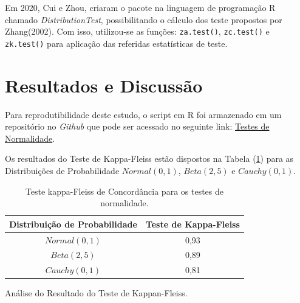 \documentclass[a4paper,11pt]{article} %
\begin{document}
Em 2020, Cui e Zhou, criaram o pacote na linguagem de programação R chamado \textit{DistributionTest}, possibilitando o cálculo dos teste propostos por Zhang(2002). Com isso,  utilizou-se as funções: \texttt{za.test()}, \texttt{zc.test()} e \texttt{zk.test()} para aplicação das referidas estatísticas de teste.


\section{Resultados e Discussão}

Para reprodutibilidade deste estudo, o script em R foi armazenado em um repositório no \textit{Github} que pode ser acessado no seguinte link: \href{https://github.com/MarioDhiego/Teste\_Normalidade}{Testes de Normalidade}.

\vspace{0.5cm}

Os resultados do Teste de Kappa-Fleiss estão dispostos na Tabela (\ref{tab:resultKappaFleiss}) para as Distribuições de Probabilidade $Normal(0, 1)$, $Beta(2, 5)$ e $Cauchy(0, 1)$.

\begin{table}[H]
\centering
\caption{Teste kappa-Fleiss de Concordância para os testes de normalidade.}
    \begin{tabular}{c|c}
    \hline
    Distribuição de Probabilidade  &  Teste de Kappa-Fleiss\\
    \hline
          $Normal(0, 1)$           &  0,93  \\
          $Beta(2, 5)$             &  0,89  \\
          $Cauchy(0, 1)$           &  0,81  \\
    \hline\hline
    \end{tabular}
    
    \label{tab:resultKappaFleiss}
\end{table}

Análise do Resultado do Teste de Kappan-Fleiss.

\vspace{0.5cm}
\end{document}
